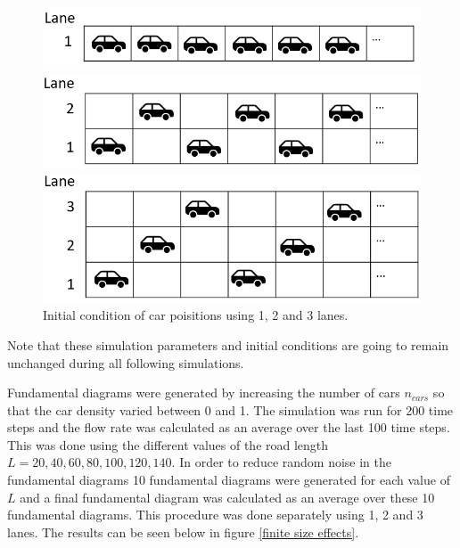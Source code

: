 \documentclass[a4paper,12pt]{article}
\begin{document}
\begin{figure}[H]
    \centering
    \begin{minipage}{1\textwidth}
        \centering
        \includegraphics[scale=0.5]{Images/ic 1 lane.png}
    \end{minipage}

    \centering
    \begin{minipage}{1\textwidth}
        \centering
        \includegraphics[scale=0.5]{Images/ic 2 lanes.png}
    \end{minipage}

    \centering
    \begin{minipage}{1\textwidth}
        \centering
        \includegraphics[scale=0.5]{Images/ic 3 lanes.png}
    \end{minipage}%
    \caption{Initial condition of car poisitions using 1, 2 and 3 lanes.}
    \label{initial conditions}
\end{figure}


Note that these simulation parameters and initial conditions are going to remain unchanged during all following simulations.

Fundamental diagrams were generated by increasing the number of cars $n_{cars}$ so that the car density varied between 0 and 1. 
The simulation was run for 200 time steps and the flow rate was calculated as an average over the last 100 time steps.
This was done using the different values of the road length $L=20, 40, 60, 80, 100, 120, 140$. In order to reduce random noise in the fundamental diagrams
10 fundamental diagrams were generated for each value of $L$ and a final fundamental diagram was calculated as an average over these 10 fundamental diagrams.
This procedure was done separately using 1, 2 and 3 lanes.
The results can be seen below in figure \ref*{finite size effects}.
\end{document}
